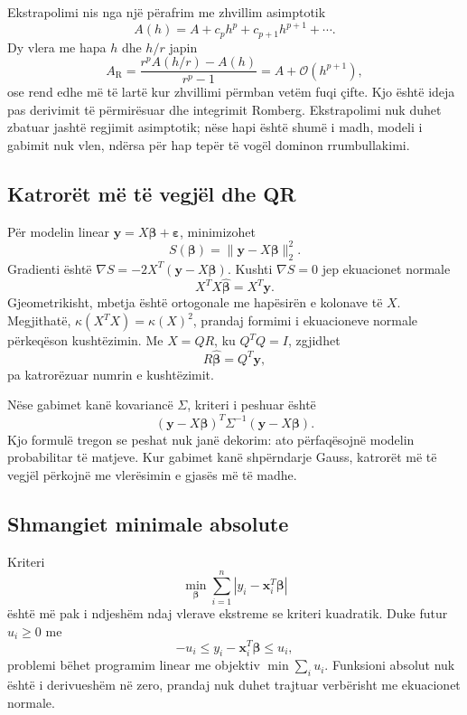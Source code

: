 \documentclass[11pt,oneside,openany]{book}
\newcommand{\vect}[1]{\bm{#1}}
\newcommand{\Oh}{\mathcal{O}}
\begin{document}
Ekstrapolimi nis nga një përafrim me zhvillim asimptotik
\begin{equation}
 A(h)=A+c_ph^p+c_{p+1}h^{p+1}+\cdots.
\end{equation}
Dy vlera me hapa $h$ dhe $h/r$ japin
\begin{equation}
 A_{\mathrm{R}}=\frac{r^pA(h/r)-A(h)}{r^p-1}
 =A+\Oh(h^{p+1}),
\end{equation}
ose rend edhe më të lartë kur zhvillimi përmban vetëm fuqi çifte. Kjo është ideja pas derivimit të përmirësuar dhe integrimit Romberg. Ekstrapolimi nuk duhet zbatuar jashtë regjimit asimptotik; nëse hapi është shumë i madh, modeli i gabimit nuk vlen, ndërsa për hap tepër të vogël dominon rrumbullakimi.

\subsection{Katrorët më të vegjël dhe QR}
Për modelin linear $\vect y=X\vect\beta+\vect\varepsilon$, minimizohet
\begin{equation}
 S(\vect\beta)=\|\vect y-X\vect\beta\|_2^2.
\end{equation}
Gradienti është $\nabla S=-2X^T(\vect y-X\vect\beta)$. Kushti $\nabla S=0$ jep ekuacionet normale
\begin{equation}
 X^TX\widehat{\vect\beta}=X^T\vect y.
\end{equation}
Gjeometrikisht, mbetja është ortogonale me hapësirën e kolonave të $X$. Megjithatë, $\kappa(X^TX)=\kappa(X)^2$, prandaj formimi i ekuacioneve normale përkeqëson kushtëzimin. Me $X=QR$, ku $Q^TQ=I$, zgjidhet
\begin{equation}
 R\widehat{\vect\beta}=Q^T\vect y,
\end{equation}
pa katrorëzuar numrin e kushtëzimit.

Nëse gabimet kanë kovariancë $\Sigma$, kriteri i peshuar është
\begin{equation}
 (\vect y-X\vect\beta)^T\Sigma^{-1}(\vect y-X\vect\beta).
\end{equation}
Kjo formulë tregon se peshat nuk janë dekorim: ato përfaqësojnë modelin probabilitar të matjeve. Kur gabimet kanë shpërndarje Gauss, katrorët më të vegjël përkojnë me vlerësimin e gjasës më të madhe.

\subsection{Shmangiet minimale absolute}
Kriteri
\begin{equation}
 \min_{\vect\beta}\sum_{i=1}^{n}|y_i-\vect x_i^T\vect\beta|
\end{equation}
është më pak i ndjeshëm ndaj vlerave ekstreme se kriteri kuadratik. Duke futur $u_i\ge0$ me
\begin{equation}
 -u_i\le y_i-\vect x_i^T\vect\beta\le u_i,
\end{equation}
problemi bëhet programim linear me objektiv $\min\sum_i u_i$. Funksioni absolut nuk është i derivueshëm në zero, prandaj nuk duhet trajtuar verbërisht me ekuacionet normale.
\end{document}
